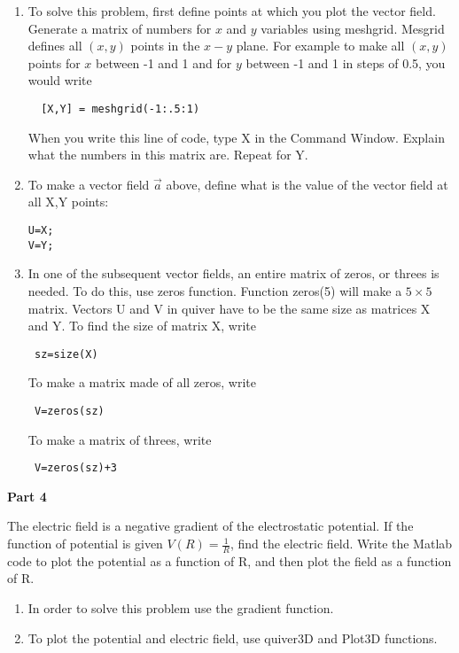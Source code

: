 \documentclass[]{report}
\begin{document}
\begin{description}
\begin{enumerate}
\item To solve this problem, first define points at which you plot the vector field. Generate a matrix of numbers for $x$ and $y$ variables using meshgrid. Mesgrid defines all $(x,y)$ points in the $x-y$ plane. For example to make all $(x,y)$ points for $x$ between -1 and 1 and for $y$ between -1 and 1 in steps of 0.5, you would write \begin{verbatim}  [X,Y] = meshgrid(-1:.5:1) \end{verbatim} When you write this line of code, type X in the Command Window. Explain what the numbers in this matrix are. Repeat for Y.
\item To make a vector field $\vec{a}$ above, define what is the value of the vector field at all X,Y points:
\begin{verbatim} 
U=X; 
V=Y;
\end{verbatim}
\item In one of the subsequent vector fields, an entire matrix of zeros, or threes is needed. To do this, use zeros function. Function zeros(5) will make a $5 \times 5$ matrix. Vectors U and V in quiver have to be the same size as matrices X and Y. To find the size of matrix X, write 
\begin{verbatim} sz=size(X)\end{verbatim} To make a matrix made of all zeros, write \begin{verbatim} V=zeros(sz) \end{verbatim} To make a matrix of threes, write \begin{verbatim} V=zeros(sz)+3 \end{verbatim}


\end{enumerate}

\item{\bf{Part 4}}

The electric field is a negative gradient of the electrostatic potential. If the function of potential is given   $V(R)=\frac{1}{R}$, find the electric field.  Write the Matlab code to plot the potential as a function of R, and then plot the field as a function of R. 

\begin{enumerate}
\item In order to solve this problem use the gradient function.
\item To plot the potential and electric field, use quiver3D and Plot3D functions.  
\end{enumerate}




\end{description}
\end{document}
